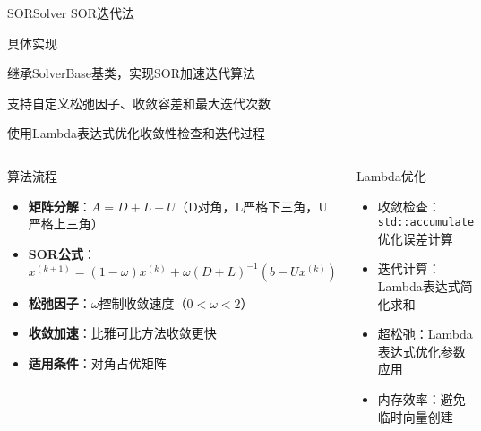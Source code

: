 \documentclass[UTF8,aspectratio=169]{beamer}
\begin{document}
\begin{frame}{SORSolver SOR迭代法}
    \begin{ytublock}{具体实现}
        \item 继承SolverBase基类，实现SOR加速迭代算法
        \item 支持自定义松弛因子、收敛容差和最大迭代次数
        \item 使用Lambda表达式优化收敛性检查和迭代过程
    \end{ytublock}

    \begin{columns}
        \begin{block}{算法流程}
            \begin{itemize}
                \item \textbf{矩阵分解}：$A = D + L + U$（D对角，L严格下三角，U严格上三角）
                \item \textbf{SOR公式}：$x^{(k+1)} = (1-\omega)x^{(k)} + \omega(D+L)^{-1}(b - U x^{(k)})$
                \item \textbf{松弛因子}：$\omega$控制收敛速度（$0 < \omega < 2$）
                \item \textbf{收敛加速}：比雅可比方法收敛更快
                \item \textbf{适用条件}：对角占优矩阵
            \end{itemize}
        \end{block}

        \begin{block}{Lambda优化}
            \begin{itemize}
                \item 收敛检查：\texttt{std::accumulate}优化误差计算
                \item 迭代计算：Lambda表达式简化求和
                \item 超松弛：Lambda表达式优化参数应用
                \item 内存效率：避免临时向量创建
            \end{itemize}
        \end{block}
    \end{columns}
\end{frame}
\end{document}
